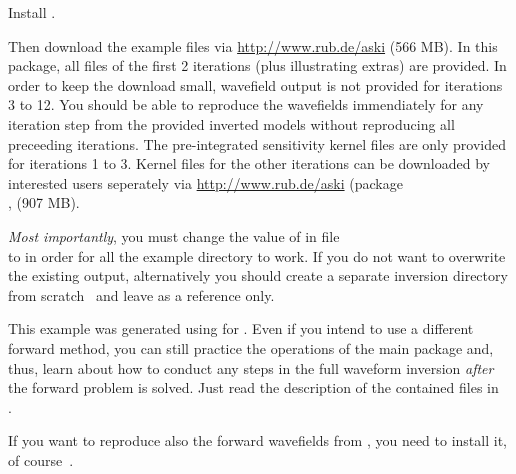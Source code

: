 Install \ASKI {}. 

Then download the example
files  via \url{http://www.rub.de/aski} (566 MB). 
In this package, all files of the first 2 iterations (plus illustrating extras) are provided. 
In order to keep the download small, wavefield output is not provided  for
iterations 3 to 12. You should be able to reproduce the wavefields immendiately for any iteration step
from the provided inverted models without reproducing all preceeding iterations. 
The pre-integrated sensitivity kernel files are only provided for
iterations 1 to 3. Kernel files for the other iterations can be downloaded by
interested users seperately via \url{http://www.rub.de/aski} (package\\
, (907 MB).

\emph{Most importantly}, you must change the value of 
in file\\
 to
 in order for all the example directory to work. 
If you do not want to overwrite the existing output, alternatively you 
should create a separate inversion directory from scratch~
 and leave 
as a reference only. 

This example was generated using  for \ASKI. Even if you intend
to use a different forward method, you can still practice the operations of the main \ASKI
package and, thus, learn about how to conduct any steps in
the full waveform inversion \emph{after} the forward problem is solved. Just read the description
of the contained files in \\
.

If you want to reproduce also the forward wavefields from , 
you need to install it, of course~.
%
%
\newpage
